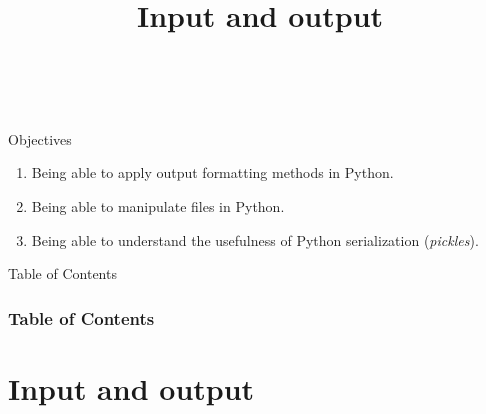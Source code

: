 \documentclass[10pt,compress]{beamer} %
\title[Input and output]{Input and output}
\author{\asignatura\\\carrera}
\institute{}
\date{}
\begin{document}
{\titlepageBlue
    \begin{frame}
        \titlepage
    \end{frame}
}

\institute{\asignatura}

\begin{frame}[plain]{}
	\begin{block}{Objectives}
		\begin{enumerate}
		\item Being able to apply output formatting methods in Python.
		\item Being able to manipulate files in Python.
		\item Being able to understand the usefulness of Python serialization (\textit{pickles}).
		\end{enumerate}
	\end{block}
\end{frame}

{
\begin{frame}[shrink]{Table of Contents}
 \frametitle{Table of Contents}
 \tableofcontents
\end{frame}
}

\section{Input and output}
\end{document}

